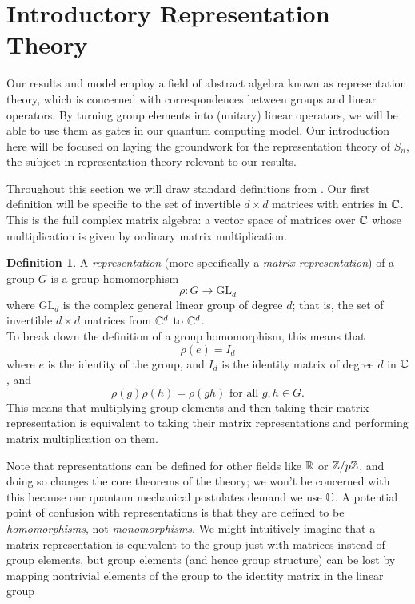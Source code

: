 \documentclass[12pt,twoside]{reedthesis}
\theoremstyle{plain}   %
\theoremstyle{definition}
\newtheorem{defn}{Definition}[section]
\theoremstyle{remark}
\numberwithin{equation}{section}
\def\GL{\mathrm{GL}} \def\SL{\mathrm{SL}}  \def\SP{\mathrm{SL}}\def\OG{\mathrm{O}}
\begin{document}
  \section{Introductory Representation Theory}
  Our results and model employ a field of abstract algebra known as representation theory, which is concerned with
  correspondences between groups and linear operators. By turning group elements into (unitary) linear operators, we will be able to use them as gates in our quantum computing model.
  Our introduction here will be focused on laying the groundwork for the representation theory of $S_n$, the subject in representation theory relevant to our results.
  \par
  Throughout this section we will draw standard definitions from \cite[Chapter 1]{sagan}.
  Our first definition will be specific to the set of invertible $d \times d$ matrices with entries in $\mathbb{C}$.
  This is the full complex matrix algebra: a vector space of matrices over $\mathbb{C}$ whose multiplication is given by ordinary matrix multiplication.
  \begin{defn}
    A \emph{representation} (more specifically a \emph{matrix representation}) of a group $G$ is a group homomorphism
    \[\rho: G \to \GL_d\]
    where $\GL_d$ is the complex general linear group of degree $d$; that is, the set of
    invertible $d \times d$ matrices from $\mathbb{C}^d$ to $\mathbb{C}^d$. \\
    To break down the definition of a group homomorphism, this means that
    \[ \rho(e) = I_d\]
    where $e$ is the identity of the group, and $I_d$ is the identity matrix of degree $d$ in $\mathbb{C}$, and
    \[\rho(g)\rho(h) = \rho(gh) \text{ for all $g,h \in G$.}\]
    This means that multiplying group elements and then taking their matrix representation is equivalent to
    taking their matrix representations and performing matrix multiplication on them.
  \end{defn}
  Note that representations can be defined for other fields like $\mathbb{R}$ or $\mathbb{Z}/p\mathbb{Z}$, and doing so changes the core theorems of the theory;
  we won't be concerned with this because our quantum mechanical postulates demand we use $\mathbb{C}$.
  A potential point of confusion with representations is that they are defined to be \emph{homomorphisms}, not \emph{monomorphisms}.
  We might intuitively imagine that a matrix representation is equivalent to the group just with matrices instead of group elements,
  but group elements (and hence group structure) can be lost by mapping nontrivial elements of the group to the identity matrix in the linear group
\end{document}
